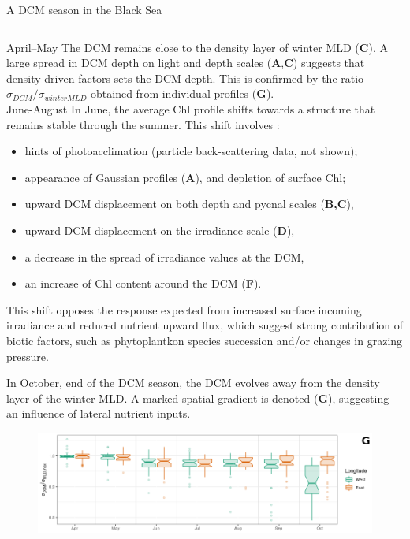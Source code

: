 \documentclass[final]{beamer}
\begin{document}
\begin{frame}[fragile]
\begin{columns}[T]
\begin{column}{.64\textwidth}
\begin{block}{ A DCM season in the Black Sea }
\begin{columns}[T]
\begin{column}{.42\textwidth}
\vspace{5mm}
\alert{April–May} The DCM remains close to the density layer of winter MLD (\textbf{C}). A large spread in DCM depth on light and depth scales (\textbf{A},\textbf{C}) suggests that density-driven factors sets the DCM depth. This is confirmed by the ratio $\sigma_{DCM}/\sigma_{winter MLD}$ obtained from individual profiles (\textbf{G}).\\

\vspace{5mm}
\alert{June-August} In June, the average Chl profile shifts towards a structure that remains stable through the summer. This shift involves :
\begin{itemize}[wide, labelwidth=!,labelindent=0pt, label=$\diamond$]
    \item hints of photoacclimation (particle  back-scattering data, not shown);
    \item appearance of Gaussian profiles (\textbf{A}),
and depletion of surface Chl;
   \item upward DCM displacement on both depth and pycnal scales
(\textbf{B,C}),
   \item upward DCM displacement on the irradiance scale (\textbf{D}),
   \item a decrease in the spread of irradiance values at the DCM,  
   \item an increase of Chl content around the DCM (\textbf{F}).
\end{itemize}
 This shift opposes the response expected from increased surface incoming irradiance and reduced nutrient upward flux, which suggest strong contribution of biotic factors, such as phytoplantkon species succession \cite{Mikaelyan2018} and/or changes in grazing pressure. \\
 
\vspace{5mm}

\alert{In October}, end of the DCM season, the DCM evolves away from the density layer of the  winter MLD. A marked spatial gradient is denoted (\textbf{G}), suggesting an influence of lateral nutrient inputs. 
 
 		    \begin{figure}
     		    \includegraphics[width=.8\columnwidth]{figs/FIG8-G.png}
		    \end{figure}
 

\end{column}
\end{columns}
\end{block}
\end{column}
\end{columns}
\end{frame}
\end{document}
